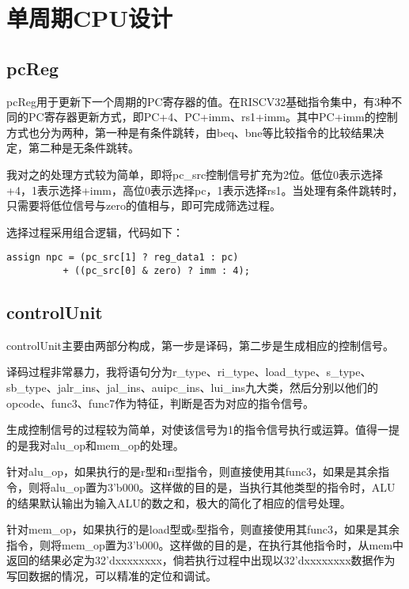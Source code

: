 \documentclass{article}
\begin{document}
    \section{单周期CPU设计}    
        \subsection{pcReg}
            \par{}
            pcReg用于更新下一个周期的PC寄存器的值。在RISCV32基础指令集中，有3种不同的PC寄存器更新方式，即PC+4、PC+imm、rs1+imm。其中PC+imm的控制方式也分为两种，第一种是有条件跳转，由beq、bne等比较指令的比较结果决定，第二种是无条件跳转。
            \par{}
            我对之的处理方式较为简单，即将pc\_src控制信号扩充为2位。低位0表示选择+4，1表示选择+imm，高位0表示选择pc，1表示选择rs1。当处理有条件跳转时，只需要将低位信号与zero的值相与，即可完成筛选过程。
            \par{}
            选择过程采用组合逻辑，代码如下：

            \begin{verbatim}
assign npc = (pc_src[1] ? reg_data1 : pc) 
          + ((pc_src[0] & zero) ? imm : 4);
            \end{verbatim}

        \subsection{controlUnit}
            \par{}
            controlUnit主要由两部分构成，第一步是译码，第二步是生成相应的控制信号。
            \par{}
            译码过程非常暴力，我将语句分为r\_type、ri\_type、load\_type、s\_type、sb\_type、jalr\_ins、jal\_ins、auipc\_ins、lui\_ins九大类，然后分别以他们的opcode、func3、func7作为特征，判断是否为对应的指令信号。
            \par{}
            生成控制信号的过程较为简单，对使该信号为1的指令信号执行或运算。值得一提的是我对alu\_op和mem\_op的处理。
            \par{}
            针对alu\_op，如果执行的是r型和ri型指令，则直接使用其func3，如果是其余指令，则将alu\_op置为3'b000。这样做的目的是，当执行其他类型的指令时，ALU的结果默认输出为输入ALU的数之和，极大的简化了相应的信号处理。
            \par{}
            针对mem\_op，如果执行的是load型或s型指令，则直接使用其func3，如果是其余指令，则将mem\_op置为3'b000。这样做的目的是，在执行其他指令时，从mem中返回的结果必定为32'dxxxxxxxx，倘若执行过程中出现以32'dxxxxxxxx数据作为写回数据的情况，可以精准的定位和调试。
\end{document}
